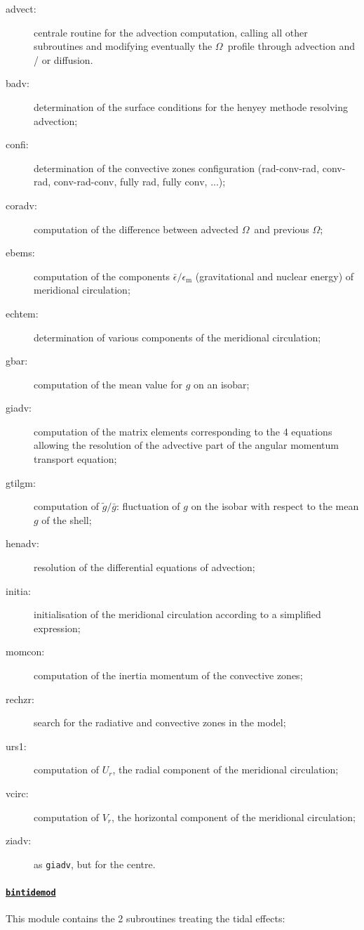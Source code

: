 \documentclass[11pt]{article}
\def\om{\ensuremath{\Omega}}
\begin{document}
 \begin{description}
   \item[advect:] centrale routine for the advection computation, calling all other subroutines and modifying eventually the \om\ profile  through advection and / or diffusion.
   \item[badv:] determination of the surface conditions for the henyey methode  resolving advection;
    \item[confi:] determination of the convective zones configuration (rad-conv-rad, conv-rad, conv-rad-conv, fully rad, fully conv, ...);
   \item[coradv:] computation of the difference between advected \om\ and previous \om;
   \item[ebems:] computation of the components $\bar{\epsilon} / \epsilon _\text{m}$ (gravitational and nuclear energy) of meridional circulation;
   \item[echtem:] determination of various components of the meridional circulation;
   \item[gbar:] computation of the mean value for $g$ on an isobar;
   \item[giadv:] computation of the matrix elements corresponding to the 4 equations allowing the resolution of the advective part of  the angular momentum transport equation;
   \item[gtilgm:] computation of $\tilde{g}/\bar{g}$: fluctuation of $g$ on the isobar with respect to the mean $g$ of the shell;
   \item[henadv:]  resolution of the differential equations of advection;
   \item[initia:] initialisation of the meridional circulation according to a simplified expression;
   \item[momcon:] computation of the inertia momentum of the convective zones;
   \item[rechzr:]  search for the radiative and convective zones in the model;
   \item[urs1:] computation of $U_r$, the radial component of the meridional circulation;
   \item[vcirc:] computation of $V_r$, the horizontal component of the meridional circulation;
   \item[ziadv:] as \texttt{giadv}, but for the centre.
\end{description}

\paragraph{\underline{\texttt{bintidemod}}}
This module contains the 2 subroutines treating the tidal effects:
\end{document}
